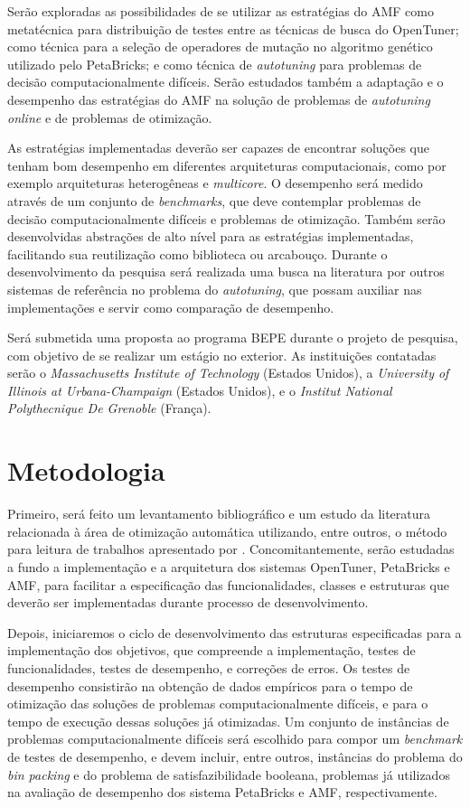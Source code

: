 \documentclass[a4paper, 11pt]{article}
\begin{document}
Serão exploradas as possibilidades de se utilizar as estratégias
do AMF como metatécnica para distribuição de testes entre as técnicas de busca
do OpenTuner; como técnica para a seleção de operadores de mutação no algoritmo
genético utilizado pelo PetaBricks; e como técnica de \emph{autotuning} para 
problemas de decisão computacionalmente difíceis. Serão estudados também a 
adaptação e o desempenho das estratégias do AMF na solução de problemas de 
\emph{autotuning online} e de problemas de otimização.

As estratégias implementadas deverão ser capazes de encontrar soluções que 
tenham bom desempenho em diferentes arquiteturas computacionais,
como por exemplo arquiteturas heterogêneas e \emph{multicore}. 
O desempenho será medido através de um conjunto de \emph{benchmarks}, que deve 
contemplar problemas de decisão computacionalmente difíceis e problemas 
de otimização. Também serão desenvolvidas abstrações de alto nível para 
as estratégias implementadas, facilitando sua reutilização como 
biblioteca ou arcabouço. 
Durante o desenvolvimento da pesquisa será realizada uma busca na literatura
por outros sistemas de referência no problema do \emph{autotuning}, que possam
auxiliar nas implementações e servir como comparação de desempenho.

Será submetida uma proposta ao programa BEPE durante o projeto de 
pesquisa, com objetivo de se realizar um estágio no exterior. As
instituições contatadas serão o \emph{Massachusetts Institute of Technology}
(Estados Unidos), a \emph{University of Illinois at Urbana-Champaign} 
(Estados Unidos), e o \emph{Institut National Polythecnique De Grenoble} 
(França).


\section{Metodologia} \label{sec:met}

Primeiro, será feito um levantamento bibliográfico e um estudo da literatura 
relacionada à área de otimização automática utilizando, entre outros, o método 
para leitura de trabalhos apresentado por \citet{keshav2007howtoread}. 
Concomitantemente, serão  estudadas a fundo a implementação e a arquitetura dos
sistemas OpenTuner, PetaBricks e AMF, para facilitar a especificação das 
funcionalidades, classes e estruturas que deverão ser implementadas durante 
processo de desenvolvimento.

Depois, iniciaremos o ciclo de desenvolvimento das estruturas especificadas
para a implementação dos objetivos, que compreende a implementação, 
testes de funcionalidades, testes de desempenho, e correções de erros.
Os testes de desempenho consistirão na obtenção de dados empíricos para o tempo
de otimização das soluções de problemas computacionalmente difíceis, e para o 
tempo de execução dessas soluções já otimizadas. Um conjunto de instâncias de 
problemas computacionalmente difíceis será escolhido para compor
um \emph{benchmark} de testes de desempenho, e devem incluir, entre outros, 
instâncias do problema do \emph{bin packing} e do problema de satisfazibilidade
booleana, problemas já utilizados na avaliação de desempenho dos sistema 
PetaBricks e AMF, respectivamente.
\end{document}
